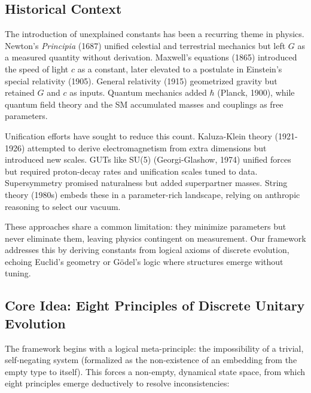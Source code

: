 \documentclass[twocolumn,prd,amsmath,amssymb,aps,superscriptaddress,nofootinbib]{revtex4-2}
\begin{document}
\subsection{Historical Context}
\label{subsec:historical-context}

The introduction of unexplained constants has been a recurring theme in physics. Newton's \emph{Principia} (1687) unified celestial and terrestrial mechanics but left $G$ as a measured quantity without derivation. Maxwell's equations (1865) introduced the speed of light $c$ as a constant, later elevated to a postulate in Einstein's special relativity (1905). General relativity (1915) geometrized gravity but retained $G$ and $c$ as inputs. Quantum mechanics added $\hbar$ (Planck, 1900), while quantum field theory and the SM accumulated masses and couplings as free parameters.

Unification efforts have sought to reduce this count. Kaluza-Klein theory (1921-1926) attempted to derive electromagnetism from extra dimensions but introduced new scales. GUTs like SU(5) (Georgi-Glashow, 1974) unified forces but required proton-decay rates and unification scales tuned to data. Supersymmetry promised naturalness but added superpartner masses. String theory (1980s) embeds these in a parameter-rich landscape, relying on anthropic reasoning to select our vacuum.

These approaches share a common limitation: they minimize parameters but never eliminate them, leaving physics contingent on measurement. Our framework addresses this by deriving constants from logical axioms of discrete evolution, echoing Euclid's geometry or Gödel's logic where structures emerge without tuning.

\subsection{Core Idea: Eight Principles of Discrete Unitary Evolution}
\label{subsec:core-idea}

The framework begins with a logical meta-principle: the impossibility of a trivial, self-negating system (formalized as the non-existence of an embedding from the empty type to itself). This forces a non-empty, dynamical state space, from which eight principles emerge deductively to resolve inconsistencies:
\end{document}
